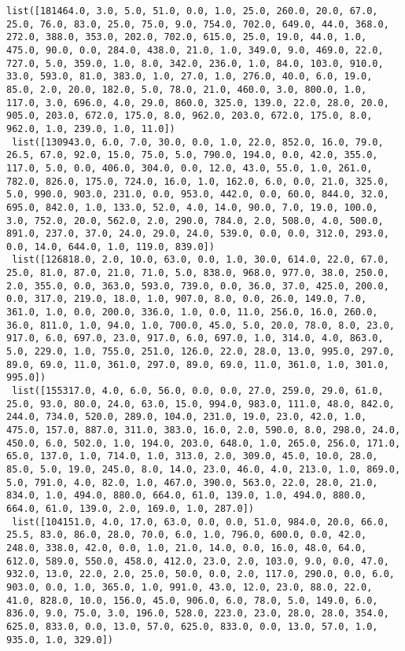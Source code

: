 \documentclass[11pt]{article}
\begin{document}
\begin{Verbatim}[commandchars=\\\{\}]
 list([181464.0, 3.0, 5.0, 51.0, 0.0, 1.0, 25.0, 260.0, 20.0, 67.0, 25.0, 76.0, 83.0, 25.0, 75.0, 9.0, 754.0, 702.0, 649.0, 44.0, 368.0, 272.0, 388.0, 353.0, 202.0, 702.0, 615.0, 25.0, 19.0, 44.0, 1.0, 475.0, 90.0, 0.0, 284.0, 438.0, 21.0, 1.0, 349.0, 9.0, 469.0, 22.0, 727.0, 5.0, 359.0, 1.0, 8.0, 342.0, 236.0, 1.0, 84.0, 103.0, 910.0, 33.0, 593.0, 81.0, 383.0, 1.0, 27.0, 1.0, 276.0, 40.0, 6.0, 19.0, 85.0, 2.0, 20.0, 182.0, 5.0, 78.0, 21.0, 460.0, 3.0, 800.0, 1.0, 117.0, 3.0, 696.0, 4.0, 29.0, 860.0, 325.0, 139.0, 22.0, 28.0, 20.0, 905.0, 203.0, 672.0, 175.0, 8.0, 962.0, 203.0, 672.0, 175.0, 8.0, 962.0, 1.0, 239.0, 1.0, 11.0])
 list([130943.0, 6.0, 7.0, 30.0, 0.0, 1.0, 22.0, 852.0, 16.0, 79.0, 26.5, 67.0, 92.0, 15.0, 75.0, 5.0, 790.0, 194.0, 0.0, 42.0, 355.0, 117.0, 5.0, 0.0, 406.0, 304.0, 0.0, 12.0, 43.0, 55.0, 1.0, 261.0, 782.0, 826.0, 175.0, 724.0, 16.0, 1.0, 162.0, 6.0, 0.0, 21.0, 325.0, 5.0, 990.0, 903.0, 231.0, 0.0, 953.0, 442.0, 0.0, 60.0, 844.0, 32.0, 695.0, 842.0, 1.0, 133.0, 52.0, 4.0, 14.0, 90.0, 7.0, 19.0, 100.0, 3.0, 752.0, 20.0, 562.0, 2.0, 290.0, 784.0, 2.0, 508.0, 4.0, 500.0, 891.0, 237.0, 37.0, 24.0, 29.0, 24.0, 539.0, 0.0, 0.0, 312.0, 293.0, 0.0, 14.0, 644.0, 1.0, 119.0, 839.0])
 list([126818.0, 2.0, 10.0, 63.0, 0.0, 1.0, 30.0, 614.0, 22.0, 67.0, 25.0, 81.0, 87.0, 21.0, 71.0, 5.0, 838.0, 968.0, 977.0, 38.0, 250.0, 2.0, 355.0, 0.0, 363.0, 593.0, 739.0, 0.0, 36.0, 37.0, 425.0, 200.0, 0.0, 317.0, 219.0, 18.0, 1.0, 907.0, 8.0, 0.0, 26.0, 149.0, 7.0, 361.0, 1.0, 0.0, 200.0, 336.0, 1.0, 0.0, 11.0, 256.0, 16.0, 260.0, 36.0, 811.0, 1.0, 94.0, 1.0, 700.0, 45.0, 5.0, 20.0, 78.0, 8.0, 23.0, 917.0, 6.0, 697.0, 23.0, 917.0, 6.0, 697.0, 1.0, 314.0, 4.0, 863.0, 5.0, 229.0, 1.0, 755.0, 251.0, 126.0, 22.0, 28.0, 13.0, 995.0, 297.0, 89.0, 69.0, 11.0, 361.0, 297.0, 89.0, 69.0, 11.0, 361.0, 1.0, 301.0, 995.0])
 list([155317.0, 4.0, 6.0, 56.0, 0.0, 0.0, 27.0, 259.0, 29.0, 61.0, 25.0, 93.0, 80.0, 24.0, 63.0, 15.0, 994.0, 983.0, 111.0, 48.0, 842.0, 244.0, 734.0, 520.0, 289.0, 104.0, 231.0, 19.0, 23.0, 42.0, 1.0, 475.0, 157.0, 887.0, 311.0, 383.0, 16.0, 2.0, 590.0, 8.0, 298.0, 24.0, 450.0, 6.0, 502.0, 1.0, 194.0, 203.0, 648.0, 1.0, 265.0, 256.0, 171.0, 65.0, 137.0, 1.0, 714.0, 1.0, 313.0, 2.0, 309.0, 45.0, 10.0, 28.0, 85.0, 5.0, 19.0, 245.0, 8.0, 14.0, 23.0, 46.0, 4.0, 213.0, 1.0, 869.0, 5.0, 791.0, 4.0, 82.0, 1.0, 467.0, 390.0, 563.0, 22.0, 28.0, 21.0, 834.0, 1.0, 494.0, 880.0, 664.0, 61.0, 139.0, 1.0, 494.0, 880.0, 664.0, 61.0, 139.0, 2.0, 169.0, 1.0, 287.0])
 list([104151.0, 4.0, 17.0, 63.0, 0.0, 0.0, 51.0, 984.0, 20.0, 66.0, 25.5, 83.0, 86.0, 28.0, 70.0, 6.0, 1.0, 796.0, 600.0, 0.0, 42.0, 248.0, 338.0, 42.0, 0.0, 1.0, 21.0, 14.0, 0.0, 16.0, 48.0, 64.0, 612.0, 589.0, 550.0, 458.0, 412.0, 23.0, 2.0, 103.0, 9.0, 0.0, 47.0, 932.0, 13.0, 22.0, 2.0, 25.0, 50.0, 0.0, 2.0, 117.0, 290.0, 0.0, 6.0, 903.0, 0.0, 1.0, 365.0, 1.0, 991.0, 43.0, 12.0, 23.0, 88.0, 22.0, 41.0, 828.0, 10.0, 156.0, 45.0, 906.0, 6.0, 78.0, 5.0, 149.0, 6.0, 836.0, 9.0, 75.0, 3.0, 196.0, 528.0, 223.0, 23.0, 28.0, 28.0, 354.0, 625.0, 833.0, 0.0, 13.0, 57.0, 625.0, 833.0, 0.0, 13.0, 57.0, 1.0, 935.0, 1.0, 329.0])

\end{Verbatim}
\end{document}
